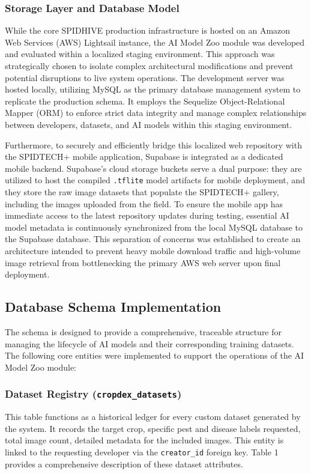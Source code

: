 \documentclass{icsthesis}
\begin{document}
\begin{mainmatter}
            \subsubsection{Storage Layer and Database Model}
            While the core SPIDHIVE production infrastructure is hosted on an Amazon Web Services (AWS) Lightsail instance, the AI Model Zoo module was developed and evaluated within a localized staging environment. This approach was strategically chosen to isolate complex architectural modifications and prevent potential disruptions to live system operations. The development server was hosted locally, utilizing MySQL as the primary database management system to replicate the production schema. It employs the Sequelize Object-Relational Mapper (ORM) to enforce strict data integrity and manage complex relationships between developers, datasets, and AI models within this staging environment.
            
            Furthermore, to securely and efficiently bridge this localized web repository with the SPIDTECH+ mobile application, Supabase is integrated as a dedicated mobile backend. Supabase’s cloud storage buckets serve a dual purpose: they are utilized to host the compiled \texttt{.tflite} model artifacts for mobile deployment, and they store the raw image datasets that populate the SPIDTECH+ gallery, including the images uploaded from the field. To ensure the mobile app has immediate access to the latest repository updates during testing, essential AI model metadata is continuously synchronized from the local MySQL database to the Supabase database. This separation of concerns was established to create an architecture intended to prevent heavy mobile download traffic and high-volume image retrieval from bottlenecking the primary AWS web server upon final deployment.
            
            \subsection{Database Schema Implementation}
            The schema is designed to provide a comprehensive, traceable structure for managing the lifecycle of AI models and their corresponding training datasets. The following core entities were implemented to support the operations of the AI Model Zoo module:
            
            \subsubsection{Dataset Registry (\texttt{cropdex\_datasets})}
            This table functions as a historical ledger for every custom dataset generated by the system. It records the target crop, specific pest and disease labels requested, total image count, detailed metadata for the included images. This entity is linked to the requesting developer via the \texttt{creator\_id} foreign key. Table 1 provides a comprehensive description of these dataset attributes.
            

\end{mainmatter}
\end{document}

